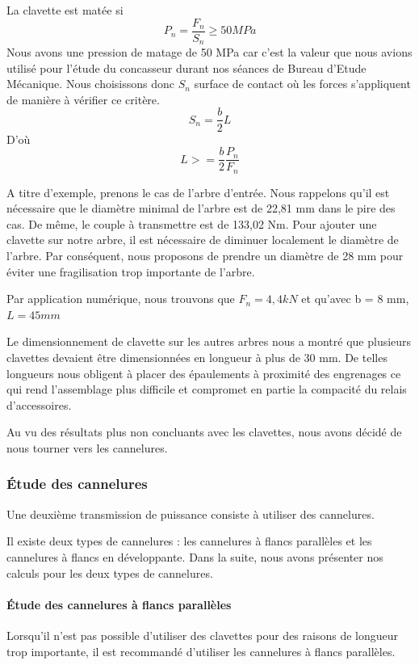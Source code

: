 \documentclass{config}
\begin{document}
\begin{spacing}{1.2}
La clavette est matée si 
\[P_n = \frac{F_n}{S_n}  \geq 50 MPa \]
Nous avons une pression de matage de 50 MPa car c'est la valeur que nous avions utilisé pour l'étude du concasseur durant nos séances de Bureau d'Etude Mécanique.
Nous choisissons donc $S_n$ surface de contact où les forces s'appliquent de manière à vérifier ce critère.
\[S_n = \frac{b}{2}L  \]
D'où  \[L>= \frac{b}{2}\frac{P_n}{F_n}\]

A titre d'exemple, prenons le cas de l'arbre d'entrée. Nous rappelons qu'il est nécessaire que le diamètre minimal de l'arbre est de 22,81 mm dans le pire des cas. De même, le couple à transmettre est de 133,02 Nm. 
Pour ajouter une clavette sur notre arbre, il est nécessaire de diminuer localement le diamètre de l'arbre. Par conséquent, nous proposons de prendre un diamètre de 28 mm pour éviter une fragilisation trop importante de l'arbre. 

Par application numérique, nous trouvons que $F_n = 4,4 kN$ et qu'avec b = 8 mm, $L = 45 mm$

Le dimensionnement de clavette sur les autres arbres nous a montré que plusieurs clavettes devaient être dimensionnées en longueur à plus de 30 mm. De telles longueurs nous obligent à placer des épaulements à proximité des engrenages ce qui rend l'assemblage plus difficile et compromet en partie la compacité du relais d'accessoires.

Au vu des résultats plus non concluants avec les clavettes, nous avons décidé de nous tourner vers les cannelures.

\subsubsection{Étude des cannelures}
Une deuxième transmission de puissance consiste à utiliser des cannelures.


Il existe deux types de cannelures : les cannelures à flancs parallèles et les cannelures à flancs en développante.
Dans la suite, nous avons présenter nos calculs pour les deux types de cannelures.

\paragraph{Étude des cannelures à flancs parallèles}

Lorsqu'il n'est pas possible d'utiliser des clavettes pour des raisons de longueur trop importante, il est recommandé d'utiliser les cannelures à flancs parallèles.


\end{spacing}
\end{document}
